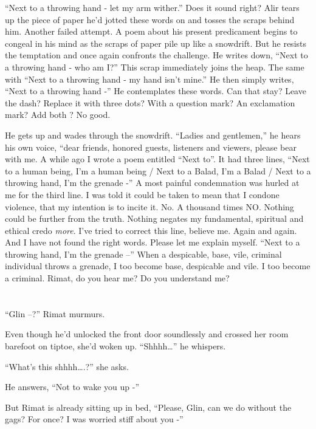 \documentclass[twoside,11pt]{book}
\begin{document}
``Next to a throwing hand - let my arm wither.'' Does it sound right? Alir tears up the piece of paper
he'd jotted these words on and tosses the scraps behind him. Another failed
attempt. A poem about his present predicament begins to congeal in his mind as the scraps of paper pile up like a
snowdrift. But he resists the temptation and once again confronts the challenge. He writes down, ``Next to
a throwing hand - who am I?'' This scrap immediately joins the heap. The same with ``Next to
a throwing hand - my hand isn't mine.'' He then simply writes,
``Next to a throwing hand -'' He contemplates these words. Can that stay? Leave the dash?
 Replace it with three dots? With a question mark? An exclamation mark? Add both ? No good.

He gets up and wades through the snowdrift. ``Ladies and gentlemen,'' he hears his own voice,
``dear friends, honored guests, listeners and viewers, please bear with me. A while ago I wrote a poem
entitled ``Next to''. It had  three lines, ``Next to  a human being, I'm a human
being  / Next to a Balad, I'm a Balad  / Next to a throwing hand, I'm the grenade -'' A most
painful condemnation was hurled at me for the third line. I was told it could be taken to mean that I
condone violence, that my intention is to incite it. No. A thousand times NO. Nothing could be further from the
truth. Nothing negates my fundamental, spiritual and ethical credo \textit{more}. I've tried to correct this line,
believe me. Again and again. And I have not found the right words. Please let me explain myself. ``Next to
a throwing hand, I'm the grenade --'' When a despicable, base, vile, criminal individual throws a grenade,
I too become base, despicable and vile. I too become a criminal. Rimat, do
you hear me? Do you understand me?



\chapter{}

``Glin --?'' Rimat murmurs.

Even though he'd unlocked the front door soundlessly and crossed her room barefoot on tiptoe, she'd woken up.
``Shhhh{\dots}'' he whispers.

``What's this shhhh{\dots}.?'' she asks.

He answers, ``Not to wake you up -''

But Rimat is already sitting up in bed, ``Please, Glin, can we do without the gags? For once? I was worried
stiff about you -''
\end{document}

